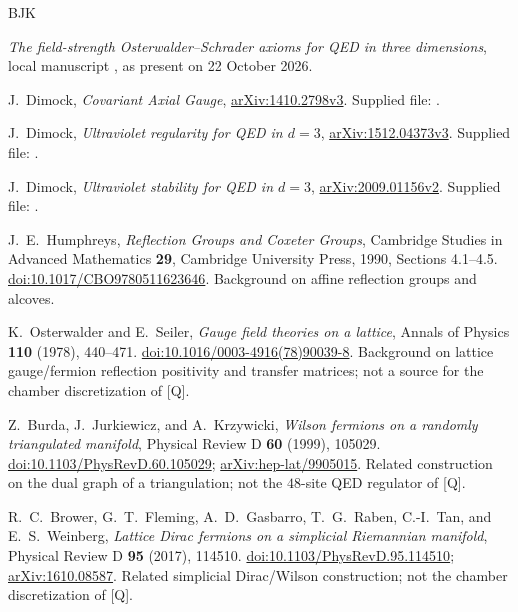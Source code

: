 \documentclass[11pt]{article}
\numberwithin{equation}{section}
\newcommand{\Q}{\textup{[Q]}}
\begin{document}
\begin{thebibliography}{BJK}
\raggedright
{}
\emph{The field-strength Osterwalder--Schrader axioms for QED in three
dimensions}, local manuscript , as present on
22 October 2026.

J.~Dimock, \emph{Covariant Axial Gauge},
\href{https://arxiv.org/abs/1410.2798v3}{arXiv:1410.2798v3}.
Supplied file: .

J.~Dimock, \emph{Ultraviolet regularity for QED in $d=3$},
\href{https://arxiv.org/abs/1512.04373v3}{arXiv:1512.04373v3}.
Supplied file: .

J.~Dimock, \emph{Ultraviolet stability for QED in $d=3$},
\href{https://arxiv.org/abs/2009.01156v2}{arXiv:2009.01156v2}.
Supplied file: .

J.~E.~Humphreys, \emph{Reflection Groups and Coxeter Groups},
Cambridge Studies in Advanced Mathematics \textbf{29},
Cambridge University Press, 1990, Sections 4.1--4.5.
\href{https://doi.org/10.1017/CBO9780511623646}{doi:10.1017/CBO9780511623646}.
Background on affine reflection groups and alcoves.

K.~Osterwalder and E.~Seiler, \emph{Gauge field theories on a lattice},
Annals of Physics \textbf{110} (1978), 440--471.
\href{https://doi.org/10.1016/0003-4916(78)90039-8}{doi:10.1016/0003-4916(78)90039-8}.
Background on lattice gauge/fermion reflection positivity and transfer
matrices; not a source for the chamber discretization of \Q.

Z.~Burda, J.~Jurkiewicz, and A.~Krzywicki,
\emph{Wilson fermions on a randomly triangulated manifold},
Physical Review D \textbf{60} (1999), 105029.
\href{https://doi.org/10.1103/PhysRevD.60.105029}{doi:10.1103/PhysRevD.60.105029};
\href{https://arxiv.org/abs/hep-lat/9905015}{arXiv:hep-lat/9905015}.
Related construction on the dual graph of a triangulation;
not the $48$-site QED regulator of \Q.

R.~C.~Brower, G.~T.~Fleming, A.~D.~Gasbarro, T.~G.~Raben,
C.-I.~Tan, and E.~S.~Weinberg,
\emph{Lattice Dirac fermions on a simplicial Riemannian manifold},
Physical Review D \textbf{95} (2017), 114510.
\href{https://doi.org/10.1103/PhysRevD.95.114510}{doi:10.1103/PhysRevD.95.114510};
\href{https://arxiv.org/abs/1610.08587}{arXiv:1610.08587}.
Related simplicial Dirac/Wilson construction; not the chamber
discretization of \Q.
\end{thebibliography}
\end{document}
